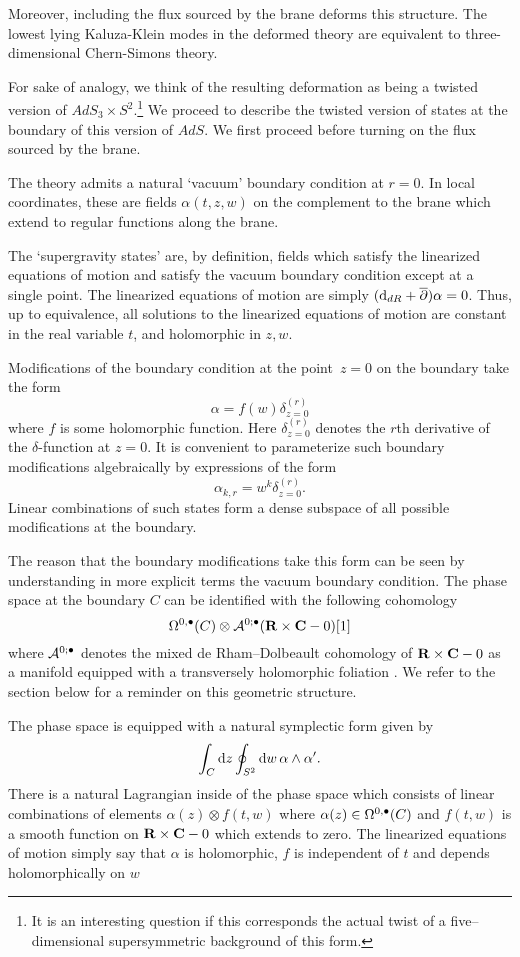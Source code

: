 Moreover, including the flux sourced by the brane deforms this structure. The lowest lying Kaluza-Klein modes in the deformed theory are equivalent to three-dimensional Chern-Simons theory.

For sake of analogy, we think of the resulting deformation as being a twisted version of $AdS_3 \times S^2$.\footnote{It is an interesting question if this corresponds the actual twist of a five--dimensional supersymmetric background of this form.}
We proceed to describe the twisted version of states at the boundary of this version of $AdS$.
We first proceed before turning on the flux sourced by the brane.

The theory admits a natural `vacuum' boundary condition at $r=0$.
In local coordinates, these are fields $\alpha(t,z,w)$ on the complement to the brane which extend to regular functions along the brane.

The `supergravity states' are, by definition, fields which satisfy the linearized equations of motion and satisfy the vacuum boundary condition except at a single point.
The linearized equations of motion are simply $({\rm d}_{dR} + \overline{\partial}) \alpha = 0$.
Thus, up to equivalence, all solutions to the linearized equations of motion are constant in the real variable $t$, and holomorphic in $z,w$.

Modifications of the boundary condition at the point~$z = 0$ on the boundary take the form
\[
\alpha = f(w) \delta^{(r)}_{z=0}
\]
where $f$ is some holomorphic function.
Here $\delta^{(r)}_{z=0}$ denotes the $r$th derivative of the $\delta$-function at $z=0$.
It is convenient to parameterize such boundary modifications algebraically by expressions of the form
\[
\alpha_{k,r} = w^k \delta^{(r)}_{z=0} .
\]
Linear combinations of such states form a dense subspace of all possible modifications at the boundary.

The reason that the boundary modifications take this form can be seen by understanding in more explicit terms the vacuum boundary condition.
The phase space at the boundary $C$ can be identified with the following cohomology
\[
\Omega^{0,\bullet}(C) \otimes \mathcal A^{0;\bullet}(\mathbf{R} \times \mathbf{C} - 0) [1]
\]
where $\mathcal A^{0;\bullet}$ denotes the mixed de Rham--Dolbeault cohomology of $\mathbf{R} \times \mathbf{C} - 0$ as a manifold equipped with a transversely holomorphic foliation \cite{DuchampKalka}.
We refer to the section below for a reminder on this geometric structure.

The phase space is equipped with a natural symplectic form given by
\[
\int_C {\rm d} z \oint_{S^2} {\rm d} w \, \alpha \wedge \alpha' .
\]
There is a natural Lagrangian inside of the phase space which consists of linear combinations of elements $\alpha(z) \otimes f(t,w)$ where $\alpha(z) \in \Omega^{0,\bullet}(C)$ and $f(t,w)$ is a smooth function on $\mathbf{R} \times \mathbf{C} - 0$ which extends to zero.
The linearized equations of motion simply say that $\alpha$ is holomorphic, $f$ is independent of $t$ and depends holomorphically on $w$

